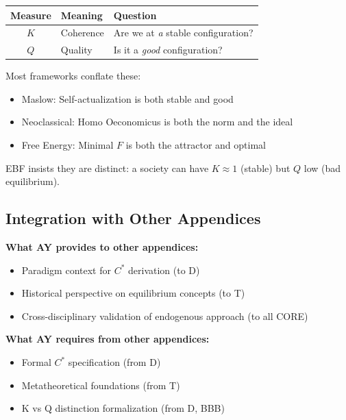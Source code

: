 \begin{center}
\begin{tabular}{|c|l|l|}
\hline
\textbf{Measure} & \textbf{Meaning} & \textbf{Question} \\
\hline
$K$ & Coherence & Are we at \emph{a} stable configuration? \\
$Q$ & Quality & Is it a \emph{good} configuration? \\
\hline
\end{tabular}
\end{center}

Most frameworks conflate these:
\begin{itemize}[nosep]
    \item Maslow: Self-actualization is both stable and good
    \item Neoclassical: Homo Oeconomicus is both the norm and the ideal
    \item Free Energy: Minimal $F$ is both the attractor and optimal
\end{itemize}

EBF insists they are distinct: a society can have $K \approx 1$ (stable)
but $Q$ low (bad equilibrium).



\subsection{Integration with Other Appendices}
\label{sec:AY-integration}

\begin{tcolorbox}[colback=yellow!5!white, colframe=yellow!75!black,
    title=\textbf{Integration: AY $\leftrightarrow$ Related Appendices}]

\textbf{What AY provides to other appendices:}
\begin{itemize}[nosep]
    \item Paradigm context for $C^*$ derivation (to D)
    \item Historical perspective on equilibrium concepts (to T)
    \item Cross-disciplinary validation of endogenous approach (to all CORE)
\end{itemize}

\textbf{What AY requires from other appendices:}
\begin{itemize}[nosep]
    \item Formal $C^*$ specification (from D)
    \item Metatheoretical foundations (from T)
    \item K vs Q distinction formalization (from D, BBB)
\end{itemize}

\end{tcolorbox}

